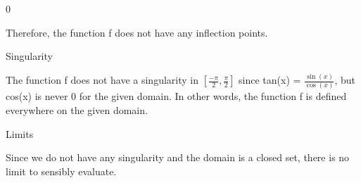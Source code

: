 \documentclass{article}
\begin{document}
\begin{doublespace}
\noindent\(0\)
\end{doublespace}

Therefore, the function f does not have any inflection points.

Singularity

The function f does not have a singularity in \(\left[\frac{-\pi }{2},\frac{\pi }{2}\right]\) since tan(x) = \(\frac{\sin (x)}{\cos (x)}\), but cos(x)
is never 0 for the given domain. In other words, the function f is defined everywhere on the given domain.

Limits

Since we do not have any singularity and the domain is a closed set, there is no limit to sensibly evaluate.
\end{document}

